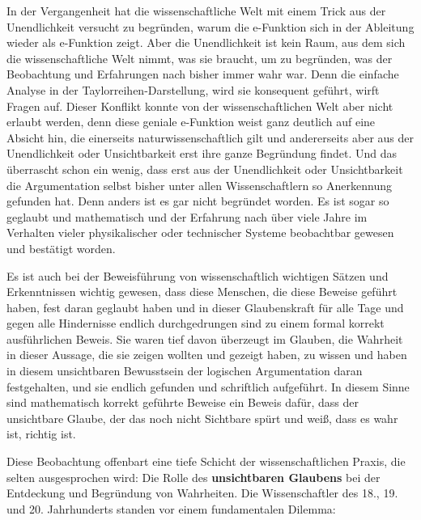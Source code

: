 \documentclass[a4paper,12pt,twoside]{report}
\theoremstyle{definition}
\begin{document}
In der Vergangenheit hat die wissenschaftliche Welt mit einem Trick aus der Unendlichkeit versucht zu begründen, warum die e-Funktion sich in der Ableitung wieder als e-Funktion zeigt. Aber die Unendlichkeit ist kein Raum, aus dem sich die wissenschaftliche Welt nimmt, was sie braucht, um zu begründen, was der Beobachtung und Erfahrungen nach bisher immer wahr war. Denn die einfache Analyse in der Taylorreihen-Darstellung, wird sie konsequent geführt, wirft Fragen auf. Dieser Konflikt konnte von der wissenschaftlichen Welt aber nicht erlaubt werden, denn diese geniale e-Funktion weist ganz deutlich auf eine Absicht hin, die einerseits naturwissenschaftlich gilt und andererseits aber aus der Unendlichkeit oder Unsichtbarkeit erst ihre ganze Begründung findet. Und das überrascht schon ein wenig, dass erst aus der Unendlichkeit oder Unsichtbarkeit die Argumentation selbst bisher unter allen Wissenschaftlern so Anerkennung gefunden hat. Denn anders ist es gar nicht begründet worden. Es ist sogar so geglaubt und mathematisch und der Erfahrung nach über viele Jahre im Verhalten vieler physikalischer oder technischer Systeme beobachtbar gewesen und bestätigt worden.

Es ist auch bei der Beweisführung von wissenschaftlich wichtigen Sätzen und Erkenntnissen wichtig gewesen, dass diese Menschen, die diese Beweise geführt haben, fest daran geglaubt haben und in dieser Glaubenskraft für alle Tage und gegen alle Hindernisse endlich durchgedrungen sind zu einem formal korrekt ausführlichen Beweis. Sie waren tief davon überzeugt im Glauben, die Wahrheit in dieser Aussage, die sie zeigen wollten und gezeigt haben, zu wissen und haben in diesem unsichtbaren Bewusstsein der logischen Argumentation daran festgehalten, und sie endlich gefunden und schriftlich aufgeführt. In diesem Sinne sind mathematisch korrekt geführte Beweise ein Beweis dafür, dass der unsichtbare Glaube, der das noch nicht Sichtbare spürt und weiß, dass es wahr ist, richtig ist.

Diese Beobachtung offenbart eine tiefe Schicht der wissenschaftlichen Praxis, die selten ausgesprochen wird: Die Rolle des \textbf{unsichtbaren Glaubens} bei der Entdeckung und Begründung von Wahrheiten. Die Wissenschaftler des 18., 19. und 20. Jahrhunderts standen vor einem fundamentalen Dilemma:
\end{document}
